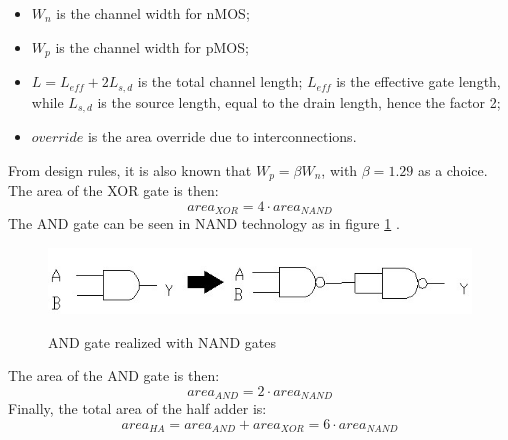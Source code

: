 \begin{itemize}
	\item $W_n$ is the channel width for nMOS;
	\item $W_p$ is the channel width for pMOS;
	\item $L = L_{eff} + 2L_{s,d}$ is the total channel length; $L_{eff}$ is the effective gate length, while $L_{s,d}$ is the source length, equal to the drain length, hence the factor 2;
	\item $override$ is the area override due to interconnections.
\end{itemize}
From design rules, it is also known that $W_p = \beta W_n$, with $\beta = 1.29$ as a choice. The area of the XOR gate is then:
\begin{equation}
area_{XOR} = 4\cdot area_{NAND}
\end{equation}
The AND gate can be seen in NAND technology as in figure \ref{and_to_nand} \cite{rif1}.
\begin{figure}
	\caption{AND gate realized with NAND gates}
	\includegraphics{img/and_to_nand.png}
	\centering
	\label{and_to_nand}
\end{figure}
The area of the AND gate is then:
\begin{equation}
area_{AND} = 2\cdot area_{NAND}
\end{equation}
Finally, the total area of the half adder is:
\begin{equation}
area_{HA} = area_{AND} + area_{XOR} = 6\cdot area_{NAND}
\end{equation}
